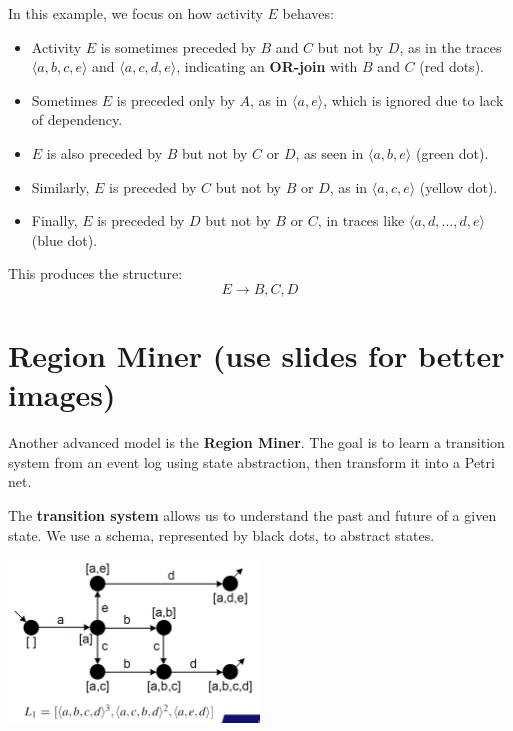In this example, we focus on how activity \(E\) behaves:
\begin{itemize}
    \item Activity \(E\) is sometimes preceded by \(B\) and \(C\) but not by \(D\), as in the traces \(\langle a, b, c, e \rangle\) and \(\langle a, c, d, e \rangle\), indicating an \textbf{OR-join} with \(B\) and \(C\) (red dots).
    \item Sometimes \(E\) is preceded only by \(A\), as in \(\langle a, e \rangle\), which is ignored due to lack of dependency.
    \item \(E\) is also preceded by \(B\) but not by \(C\) or \(D\), as seen in \(\langle a, b, e \rangle\) (green dot).
    \item Similarly, \(E\) is preceded by \(C\) but not by \(B\) or \(D\), as in \(\langle a, c, e \rangle\) (yellow dot).
    \item Finally, \(E\) is preceded by \(D\) but not by \(B\) or \(C\), in traces like \(\langle a, d, ..., d, e \rangle\) (blue dot).
\end{itemize}

This produces the structure:
\[
E \rightarrow B, C, D
\]



\section{Region Miner (use slides for better images)}

Another advanced model is the \textbf{Region Miner}. The goal is to learn a transition system from an event log using state abstraction, then transform it into a Petri net.

The \textbf{transition system} allows us to understand the past and future of a given state. We use a schema, represented by black dots, to abstract states.

\begin{center}
    \includegraphics[width=0.5\textwidth]{capitolo 6/6 region miner scheme.png} %
\end{center}

